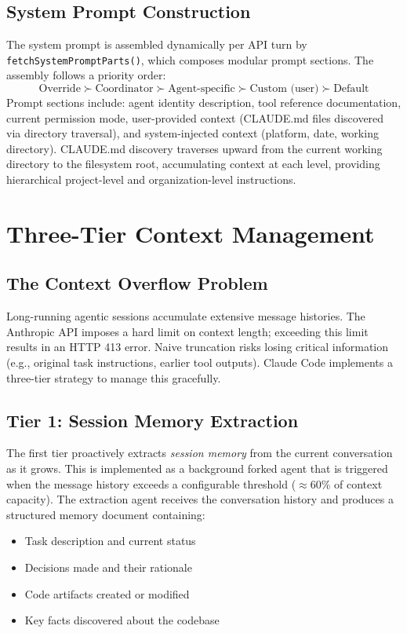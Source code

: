 \documentclass{article}
\begin{document}
\subsection{System Prompt Construction}

The system prompt is assembled dynamically per API turn by \texttt{fetchSystemPromptParts()}, which composes modular prompt sections. The assembly follows a priority order:
\[
\text{Override} \succ \text{Coordinator} \succ \text{Agent-specific} \succ \text{Custom (user)} \succ \text{Default}
\]
Prompt sections include: agent identity description, tool reference documentation, current permission mode, user-provided context (CLAUDE.md files discovered via directory traversal), and system-injected context (platform, date, working directory). CLAUDE.md discovery traverses upward from the current working directory to the filesystem root, accumulating context at each level, providing hierarchical project-level and organization-level instructions.

\section{Three-Tier Context Management}

\subsection{The Context Overflow Problem}

Long-running agentic sessions accumulate extensive message histories. The Anthropic API imposes a hard limit on context length; exceeding this limit results in an HTTP 413 error. Naive truncation risks losing critical information (e.g., original task instructions, earlier tool outputs). Claude Code implements a three-tier strategy to manage this gracefully.

\subsection{Tier 1: Session Memory Extraction}

The first tier proactively extracts \emph{session memory} from the current conversation as it grows. This is implemented as a background forked agent that is triggered when the message history exceeds a configurable threshold ($\approx$60\% of context capacity). The extraction agent receives the conversation history and produces a structured memory document containing:
\begin{itemize}
  \item Task description and current status
  \item Decisions made and their rationale
  \item Code artifacts created or modified
  \item Key facts discovered about the codebase
\end{itemize}
\end{document}
